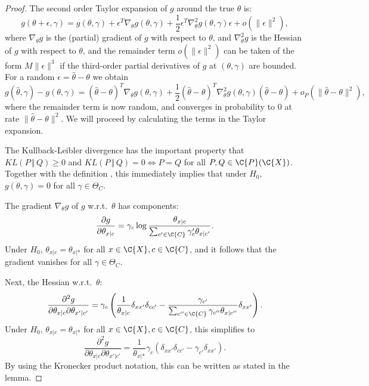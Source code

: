 \begin{proof}
The second order Taylor expansion of $g$ around the true $\theta$ is:
$$g(\theta + \epsilon, \gamma) = g(\theta,\gamma) + \epsilon^T \nabla_\theta g(\theta,\gamma) + \frac{1}{2} \epsilon^T \nabla^2_\theta g(\theta,\gamma) \epsilon + o(\lVert\epsilon\rVert^2),$$
where $\nabla_\theta g$ is the (partial) gradient of $g$ with respect to $\theta$, and
$\nabla_\theta^2 g$ is the Hessian of $g$ with respect to $\theta$, and the remainder
term $o(\lVert\epsilon\rVert^2)$ can be taken of the form $M \lVert\epsilon\rVert^3$ if the 
third-order partial derivatives of $g$ at $(\theta,\gamma)$ are bounded.
For a random $\epsilon = \hat\theta - \theta$ we obtain
  \begin{equation}\label{eq:g_expansion}
    g(\hat\theta, \gamma) - g(\theta,\gamma) = (\hat\theta - \theta)^T \nabla_\theta g(\theta,\gamma) + \frac{1}{2} (\hat\theta - \theta)^T \nabla^2_\theta g(\theta,\gamma) (\hat\theta - \theta) + o_P(\lVert\hat\theta - \theta\rVert^2),
  \end{equation}
where the remainder term is now random, and converges 
in probability to 0 at rate $\lVert\hat\theta - \theta\rVert^2$.
We will proceed by calculating the terms in the Taylor expansion.

The Kullback-Leibler divergence has the important property that $KL(P \,\Vert\, Q) \ge 0$ and $KL(P \,\Vert\, Q) = 0 \iff P = Q$ for all $P,Q \in \C{P}(\C{X})$. 
Together with the definition , 
this immediately implies that under $H_0$, $g(\theta,\gamma) = 0$ for all $\gamma \in \Theta_C$.

The gradient $\nabla_\theta g$ of $g$ w.r.t.\ $\theta$ has components:
  $$\frac{\partial g}{\partial \theta_{x|c}} 
  = \gamma_c \log \frac{\theta_{x|c}}{\sum_{c'\in\C{C}} \gamma_c' \theta_{x|c'}}.$$
Under $H_0$, $\theta_{x|c} = \theta_{x|\ast}$ for all $x\in\C{X},c\in\C{C}$, and it follows that
the gradient vanishes for all $\gamma\in\Theta_C$.

Next, the Hessian w.r.t.\ $\theta$:
  $$\frac{\partial^2 g}{\partial \theta_{x|c} \partial \theta_{x'|c'}} = 
  \gamma_c \left( \frac{1}{\theta_{x|c}} \delta_{xx'} \delta_{cc'} - \frac{\gamma_{c'}}{\sum_{c''\in\C{C}} \gamma_{c''} \theta_{x|c''}} \delta_{xx'} \right).
  $$
Under $H_0$, $\theta_{x|c} = \theta_{x|\ast}$ for all $x\in\C{X},c\in\C{C}$, this simplifies to
  $$\frac{\partial^2 g}{\partial \theta_{x|c} \partial \theta_{x'|c'}} = 
  \frac{1}{\theta_{x|\ast}} \gamma_c \left( \delta_{xx'} \delta_{cc'} - \gamma_{c'} \delta_{xx'} \right).
  $$
By using the Kronecker product notation, this can be written as stated in the lemma.


\end{proof}
